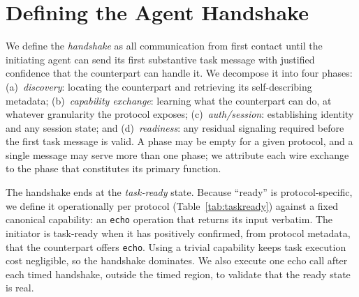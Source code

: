 \documentclass[10pt]{article}
\begin{document}
\section{Defining the Agent Handshake}
\label{sec:defs}

We define the \emph{handshake} as all communication from first contact
until the initiating agent can send its first substantive task message
with justified confidence that the counterpart can handle it. We
decompose it into four phases:
(a)~\emph{discovery}: locating the counterpart and retrieving its
self-describing metadata;
(b)~\emph{capability exchange}: learning what the counterpart can do, at
whatever granularity the protocol exposes;
(c)~\emph{auth/session}: establishing identity and any session state; and
(d)~\emph{readiness}: any residual signaling required before the first
task message is valid.
A phase may be empty for a given protocol, and a single message may serve
more than one phase; we attribute each wire exchange to the phase that
constitutes its primary function.

The handshake ends at the \emph{task-ready} state. Because ``ready'' is
protocol-specific, we define it operationally per protocol
(Table~\ref{tab:taskready}) against a fixed canonical capability: an
\texttt{echo} operation that returns its input verbatim. The initiator is
task-ready when it has positively confirmed, from protocol metadata, that
the counterpart offers \texttt{echo}. Using a trivial capability keeps
task execution cost negligible, so the handshake dominates. We also
execute one echo call after each timed handshake, outside the timed
region, to validate that the ready state is real.
\end{document}
